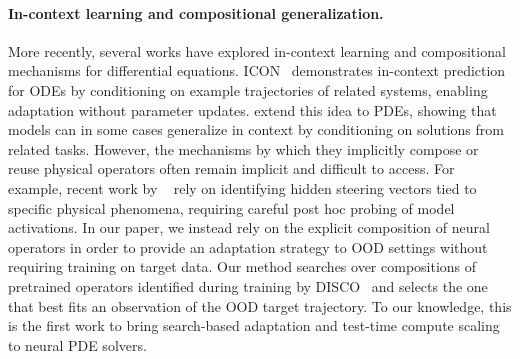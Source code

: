 \documentclass{article}
\theoremstyle{plain}
\theoremstyle{definition}
\theoremstyle{remark}
\begin{document}
\paragraph{In-context learning and compositional generalization.}
More recently, several works have explored in-context learning and compositional mechanisms for differential equations. ICON~\citep{icon} demonstrates in-context prediction for ODEs by conditioning on example trajectories of related systems, enabling adaptation without parameter updates. \citet{Cao2024, serrano2025zebra, koupai2025enma} extend this idea to PDEs, showing that models can in some cases generalize in context by conditioning on solutions from related tasks. However, the mechanisms by which they implicitly compose or reuse physical operators often remain implicit and difficult to access. 
For example, recent work by ~\citet{fear2025physics} rely on identifying hidden steering vectors tied to specific physical phenomena, requiring careful post hoc probing of model activations. 
In our paper, we instead rely on the explicit composition of neural operators in order to provide an adaptation strategy to OOD settings without requiring training on target data. 
Our method searches over compositions of pretrained operators identified during training by DISCO~\cite{morel2025disco} and selects the one that best fits an observation of the OOD target trajectory. To our knowledge, this is the first work to bring search-based adaptation and test-time compute scaling to neural PDE solvers.

\end{document}
